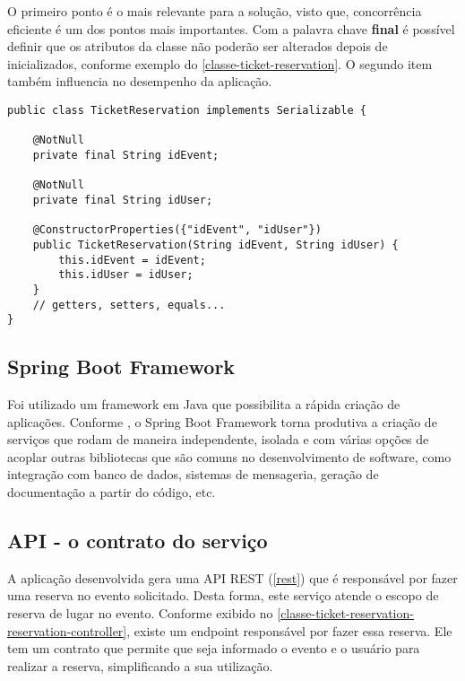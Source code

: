 
O primeiro ponto é o mais relevante para a solução, visto que, concorrência
eficiente é um dos pontos mais importantes. Com a palavra chave \textbf{final} é
possível definir que os atributos da classe não poderão ser alterados depois
de inicializados, conforme exemplo do \autoref{classe-ticket-reservation}. O
segundo item também influencia no desempenho da aplicação.

\begin{lstlisting}[label=classe-ticket-reservation,caption=Classe TicketReservation em Java]
public class TicketReservation implements Serializable {

    @NotNull
    private final String idEvent;

    @NotNull
    private final String idUser;

    @ConstructorProperties({"idEvent", "idUser"})
    public TicketReservation(String idEvent, String idUser) {
        this.idEvent = idEvent;
        this.idUser = idUser;
    }
    // getters, setters, equals...
}
\end{lstlisting}

\subsection{Spring Boot Framework}

Foi utilizado um framework em Java que possibilita a rápida criação de aplicações.
Conforme \cite[8]{spring-boot-reference-guide}, o Spring Boot Framework torna
produtiva a criação de serviços que rodam de maneira independente, isolada
e com várias opções de acoplar outras bibliotecas que são comuns no desenvolvimento
de software, como integração com banco de dados, sistemas de mensageria, geração
de documentação a partir do código, etc.

\subsection{API - o contrato do serviço}\label{api}

A aplicação desenvolvida gera uma API REST (\autoref{rest}) que é responsável por fazer uma reserva
no evento solicitado. Desta forma, este serviço atende o escopo de reserva de lugar no
evento. Conforme exibido no \autoref{classe-ticket-reservation-reservation-controller}, existe um endpoint responsável
por fazer essa reserva. Ele tem um contrato que permite que seja informado o evento e
o usuário para realizar a reserva, simplificando a sua utilização.

